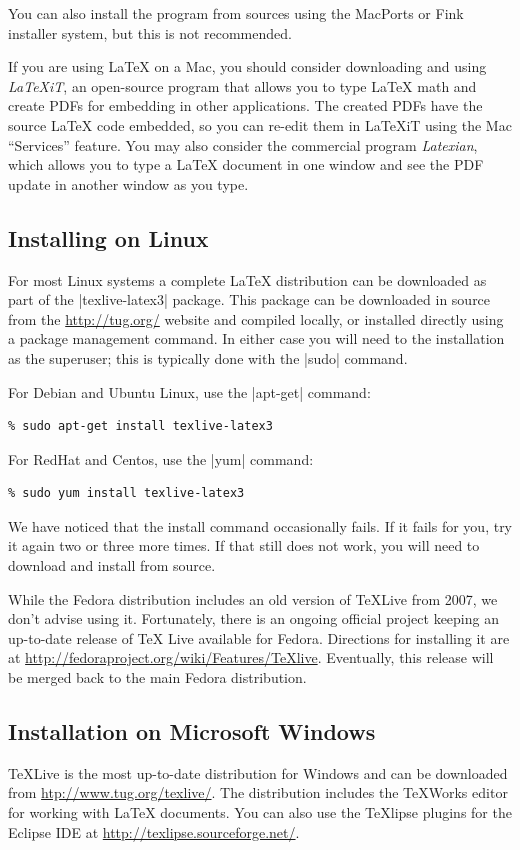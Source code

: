 You can also install the program from sources using the MacPorts or Fink installer system, but this is not recommended. 

If you are using \LaTeX{} on a Mac, you should consider downloading
and using \emph{LaTeXiT}, an open-source program that allows you to type
\LaTeX{} math and create PDFs for embedding in other applications. The
created PDFs have the source \LaTeX{} code embedded, so you can re-edit
them in LaTeXiT using the Mac ``Services'' feature.  You may also consider the
commercial program \emph{Latexian}, which allows you to type a
\LaTeX{} document in one window
and see the PDF update in another window as you type.

\subsection{Installing on Linux}
For most Linux systems a complete \LaTeX{} distribution 
can be downloaded as part of the |texlive-latex3| package. This
package can be downloaded in source from the \url{http://tug.org/}
website and compiled locally, or installed directly using a package
management command. In either case you will need to the installation
as the superuser; this is typically done with the |sudo| command.

For Debian and Ubuntu Linux, use the |apt-get| command:

\begin{Verbatim}
% sudo apt-get install texlive-latex3
\end{Verbatim}

For RedHat and Centos, use the |yum| command:

\begin{Verbatim}
% sudo yum install texlive-latex3
\end{Verbatim}

We have noticed that the install command occasionally fails. If it
fails for you, try it again two or three more times. If that still
does not work, you will need to download and install from source.

While the Fedora distribution includes an old version of
\TeX Live from 2007, we don't advise using it.  Fortunately, there is
an ongoing official project keeping an up-to-date release of \TeX
Live available for Fedora.  Directions for installing it are at
\url{http://fedoraproject.org/wiki/Features/TeXlive}.  Eventually,
this release will be merged back to the main Fedora distribution.

\subsection{Installation on Microsoft Windows}
\TeX Live is the most up-to-date distribution for Windows and can
be downloaded from \url{htp://www.tug.org/texlive/}.  The
distribution includes the {\TeX}Works editor for working with
\LaTeX{} documents.  You can also use the {\TeX}lipse plugins for
the Eclipse IDE at \url{http://texlipse.sourceforge.net/}.

